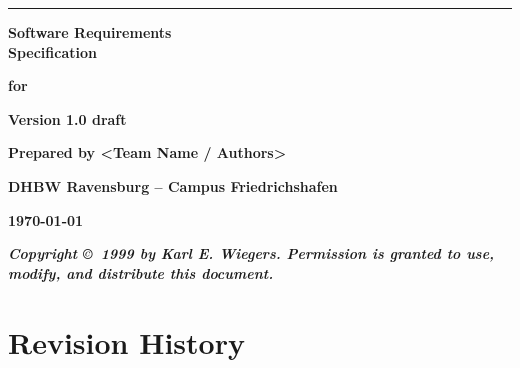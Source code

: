 \documentclass[11pt, a4paper]{article}
\newcommand{\projecttitle}{<Project Name>}
\newcommand{\docversion}{Version 1.0 draft}
\newcommand{\docauthor}{<Team Name / Authors>}
\newcommand{\docorg}{DHBW Ravensburg -- Campus Friedrichshafen}
\newcommand{\docdate}{\today}
\begin{document}
\begin{titlepage}
    \sffamily
    \noindent\rule{\textwidth}{3pt}
    \vspace{1.2cm}
    
    \begin{flushright}
        {\fontsize{28}{34}\selectfont\bfseries Software Requirements\\Specification\par}
        \vspace{1.2cm}
        {\Large\bfseries for\par}
        \vspace{1.2cm}
        {\fontsize{24}{30}\selectfont\bfseries \projecttitle\par}
        \vspace{1.8cm}
        {\large\bfseries \docversion\par}
        \vspace{1.2cm}
        {\large\bfseries Prepared by \docauthor\par}
        \vspace{1.2cm}
        {\large\bfseries \docorg\par}
        \vspace{1.2cm}
        {\large\bfseries \docdate\par}
    \end{flushright}
    
    \vfill
    \rmfamily
    \begin{center}
        \small\textit{\textbf{Copyright \copyright\ 1999 by Karl E. Wiegers. Permission is granted to use, modify, and distribute this document.}}
    \end{center}
\end{titlepage}

\setcounter{page}{2} %

\renewcommand{\contentsname}{Table of Contents}
\tableofcontents

\vspace{1.2cm}
\section*{Revision History}
\end{document}
